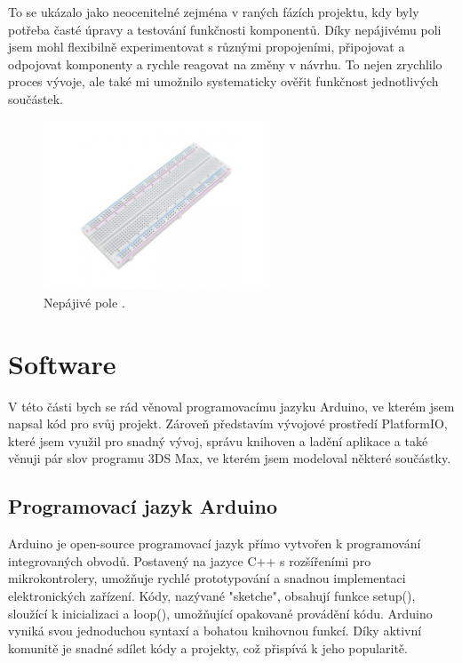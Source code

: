 \documentclass[12pt, a4paper,
oneside
openany
]{report}
\begin{document}
\noindent To se ukázalo jako neocenitelné zejména v raných fázích projektu, kdy byly potřeba časté úpravy a testování funkčnosti komponentů. Díky nepájivému poli jsem mohl flexibilně experimentovat s různými propojeními, připojovat a odpojovat komponenty a rychle reagovat na změny v návrhu. To nejen zrychlilo proces vývoje, ale také mi umožnilo systematicky ověřit funkčnost jednotlivých součástek.

\vspace*{0.05\textheight}
	\begin{figure}[ht]
		\centering 
		\includegraphics[width=0.6\textwidth]{image/pole.jpg} %
		\caption{Nepájivé pole \cite{pole}.} 
	\end{figure}



\newpage
\section{Software}
\label{sec:prace_s_textem}

V této části bych se rád věnoval programovacímu jazyku Arduino, ve kterém jsem napsal kód pro svůj projekt. Zároveň představím vývojové prostředí PlatformIO, které jsem využil pro snadný vývoj, správu knihoven a ladění aplikace a také věnuji pár slov programu 3DS Max, ve kterém jsem modeloval některé součástky.

\subsection{Programovací jazyk Arduino}
\noindent Arduino je open-source programovací jazyk přímo vytvořen k programování integrovaných obvodů. Postavený na jazyce C++ s rozšířeními pro mikrokontrolery, umožňuje rychlé prototypování a snadnou implementaci elektronických zařízení. Kódy, nazývané "sketche", obsahují funkce setup(), sloužící k inicializaci a loop(), umožňující opakované provádění kódu. Arduino vyniká svou jednoduchou syntaxí a bohatou knihovnou funkcí. Díky aktivní komunitě je snadné sdílet kódy a projekty, což přispívá k jeho popularitě.
\end{document}
